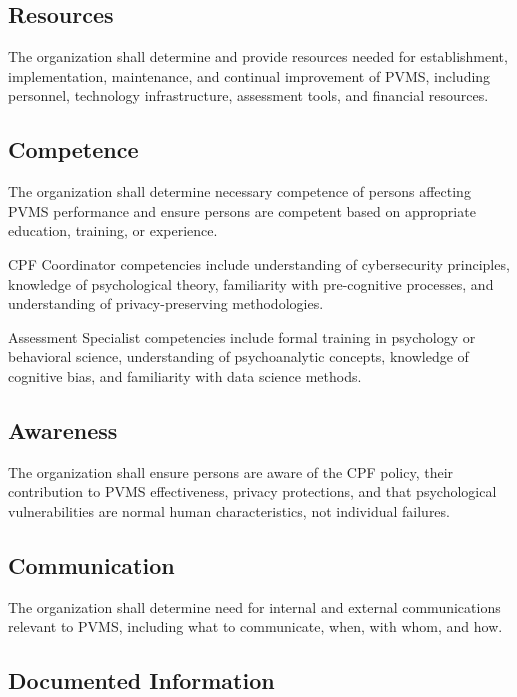 \documentclass[11pt,a4paper]{article}
\begin{document}
\subsection{Resources}

The organization shall determine and provide resources needed for establishment, implementation, maintenance, and continual improvement of PVMS, including personnel, technology infrastructure, assessment tools, and financial resources.

\subsection{Competence}

The organization shall determine necessary competence of persons affecting PVMS performance and ensure persons are competent based on appropriate education, training, or experience.

CPF Coordinator competencies include understanding of cybersecurity principles, knowledge of psychological theory, familiarity with pre-cognitive processes, and understanding of privacy-preserving methodologies.

Assessment Specialist competencies include formal training in psychology or behavioral science, understanding of psychoanalytic concepts, knowledge of cognitive bias, and familiarity with data science methods.

\subsection{Awareness}

The organization shall ensure persons are aware of the CPF policy, their contribution to PVMS effectiveness, privacy protections, and that psychological vulnerabilities are normal human characteristics, not individual failures.

\subsection{Communication}

The organization shall determine need for internal and external communications relevant to PVMS, including what to communicate, when, with whom, and how.

\subsection{Documented Information}
\end{document}
